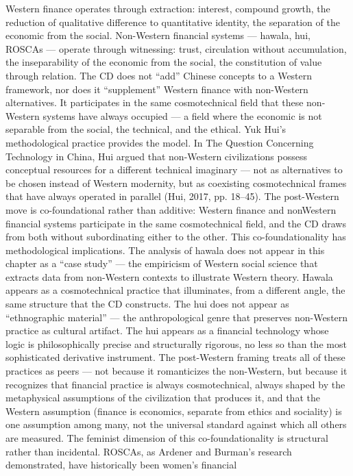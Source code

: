 Western finance operates through extraction: interest, compound growth, the reduction of qualitative difference to quantitative identity, the separation of the economic from the social. Non-Western financial systems — hawala, hui, ROSCAs — operate through witnessing: trust, circulation without accumulation, the inseparability of the economic from the social, the constitution of value through relation. The CD does not “add” Chinese concepts to a Western framework, nor does it “supplement” Western finance with non-Western alternatives. It participates in the same cosmotechnical field that these non-Western systems have always occupied — a field where the economic is not separable from the social, the technical, and the ethical. Yuk Hui’s methodological practice provides the model. In The Question Concerning Technology in China, Hui argued that non-Western civilizations possess conceptual resources for a different technical imaginary — not as alternatives to be chosen instead of Western modernity, but as coexisting cosmotechnical frames that have always operated in parallel (Hui, 2017, pp. 18–45). The post-Western move is co-foundational rather than additive: Western finance and nonWestern financial systems participate in the same cosmotechnical field, and the CD draws from both without subordinating either to the other. This co-foundationality has methodological implications. The analysis of hawala does not appear in this chapter as a “case study” — the empiricism of Western social science that extracts data from non-Western contexts to illustrate Western theory. Hawala appears as a cosmotechnical practice that illuminates, from a different angle, the same structure that the CD constructs. The hui does not appear as “ethnographic material” — the anthropological genre that preserves non-Western practice as cultural artifact. The hui appears as a financial technology whose logic is philosophically precise and structurally rigorous, no less so than the most sophisticated derivative instrument. The post-Western framing treats all of these practices as peers — not because it romanticizes the non-Western, but because it recognizes that financial practice is always cosmotechnical, always shaped by the metaphysical assumptions of the civilization that produces it, and that the Western assumption (finance is economics, separate from ethics and sociality) is one assumption among many, not the universal standard against which all others are measured. The feminist dimension of this co-foundationality is structural rather than incidental. ROSCAs, as Ardener and Burman’s research demonstrated, have historically been women’s financial

